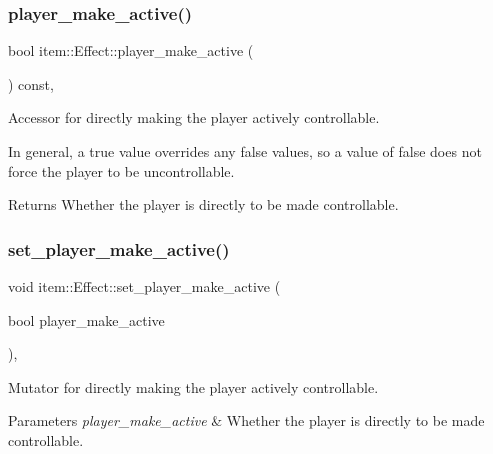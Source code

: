 \subsubsection{\texorpdfstring{player\+\_\+make\+\_\+active()}{player\_make\_active()}}
{\footnotesize\ttfamily bool item\+::\+Effect\+::player\+\_\+make\+\_\+active (\begin{DoxyParamCaption}{ }\end{DoxyParamCaption}) const\hspace{0.3cm}{\ttfamily [inline]}, {\ttfamily [noexcept]}}



Accessor for directly making the player actively controllable. 

In general, a {\ttfamily true} value overrides any {\ttfamily false} values, so a value of {\ttfamily false} does not force the player to be uncontrollable. \begin{DoxyReturn}{Returns}
Whether the player is directly to be made controllable. 
\end{DoxyReturn}
\mbox{\label{classitem_1_1_effect_aedb5619a40edeb90776d14691cdb80b1}} 
\subsubsection{\texorpdfstring{set\+\_\+player\+\_\+make\+\_\+active()}{set\_player\_make\_active()}}
{\footnotesize\ttfamily void item\+::\+Effect\+::set\+\_\+player\+\_\+make\+\_\+active (\begin{DoxyParamCaption}\item[{bool}]{player\+\_\+make\+\_\+active }\end{DoxyParamCaption})\hspace{0.3cm}{\ttfamily [inline]}, {\ttfamily [noexcept]}}



Mutator for directly making the player actively controllable. 


\begin{DoxyParams}{Parameters}
{\em player\+\_\+make\+\_\+active} & Whether the player is directly to be made controllable. \\
\hline
\end{DoxyParams}
\mbox{\label{classitem_1_1_effect_a81c4b4c173683d278e1eae7e4ab8048a}} 
